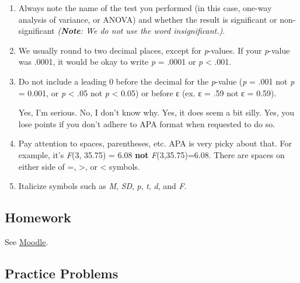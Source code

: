 \documentclass[
]{book}
\begin{document}
\begin{enumerate}
\def\labelenumi{\arabic{enumi}.}
\item
  Always note the name of the test you performed (in this case, one-way analysis of variance, or ANOVA) and whether the result is significant or non-significant \emph{(\textbf{Note}: We do not use the word insignificant.)}.
\item
  We usually round to two decimal places, except for \emph{p}-values. If your \emph{p}-value was .0001, it would be okay to write \emph{p} = .0001 or \emph{p} \textless{} .001.
\item
  Do not include a leading 0 before the decimal for the \emph{p}-value (\emph{p} = .001 not \emph{p} = 0.001, or \emph{p} \textless{} .05 not \emph{p} \textless{} 0.05) or before ε (ex. ε = .59 not ε = 0.59).

  Yes, I'm serious. No, I don't know why. Yes, it does seem a bit silly. Yes, you lose points if you don't adhere to APA format when requested to do so.
\item
  Pay attention to spaces, parentheses, etc. APA is very picky about that. For example, it's \emph{F}(3, 35.75) = 6.08 \textbf{not} \emph{F}(3,35.75)=6.08. There are spaces on either side of =, \textgreater, or \textless{} symbols.
\item
  Italicize symbols such as \emph{M}, \emph{SD}, \emph{p}, \emph{t}, \emph{d}, and \emph{F}.
\end{enumerate}

\hypertarget{homework-7}{%
\subsection{Homework}\label{homework-7}}

See \href{https://moodle.stfx.ca/course/view.php?id=28797}{Moodle}.

\hypertarget{practice-problems-6}{%
\subsection{Practice Problems}\label{practice-problems-6}}
\end{document}
